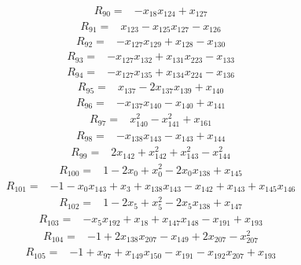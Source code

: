 \begin{align*}
 R_{90}={}&-x_{18}x_{124} +x_{127}
\end{align*}
\begin{align*}
 R_{91}={}&x_{123} -x_{125}x_{127} -x_{126}
\end{align*}
\begin{align*}
 R_{92}={}&-x_{127}x_{129} +x_{128} -x_{130}
\end{align*}
\begin{align*}
 R_{93}={}&-x_{127}x_{132} +x_{131}x_{223} -x_{133}
\end{align*}
\begin{align*}
 R_{94}={}&-x_{127}x_{135} +x_{134}x_{224} -x_{136}
\end{align*}
\begin{align*}
 R_{95}={}&x_{137} -2x_{137}x_{139} +x_{140}
\end{align*}
\begin{align*}
 R_{96}={}&-x_{137}x_{140} -x_{140} +x_{141}
\end{align*}
\begin{align*}
 R_{97}={}&x_{140}^{2} -x_{141}^{2} +x_{161}
\end{align*}
\begin{align*}
 R_{98}={}&-x_{138}x_{143} -x_{143} +x_{144}
\end{align*}
\begin{align*}
 R_{99}={}&2x_{142} +x_{142}^{2} +x_{143}^{2} -x_{144}^{2}
\end{align*}
\begin{align*}
 R_{100}={}&1 -2x_{0} +x_{0}^{2} -2x_{0}x_{138} +x_{145}
\end{align*}
\begin{align*}
 R_{101}={}&-1 -x_{0}x_{143} +x_{3} +x_{138}x_{143} -x_{142} +x_{143} +x_{145}x_{146}
\end{align*}
\begin{align*}
 R_{102}={}&1 -2x_{5} +x_{5}^{2} -2x_{5}x_{138} +x_{147}
\end{align*}
\begin{align*}
 R_{103}={}&-x_{5}x_{192} +x_{18} +x_{147}x_{148} -x_{191} +x_{193}
\end{align*}
\begin{align*}
 R_{104}={}&-1 +2x_{138}x_{207} -x_{149} +2x_{207} -x_{207}^{2}
\end{align*}
\begin{align*}
 R_{105}={}&-1 +x_{97} +x_{149}x_{150} -x_{191} -x_{192}x_{207} +x_{193}
\end{align*}
